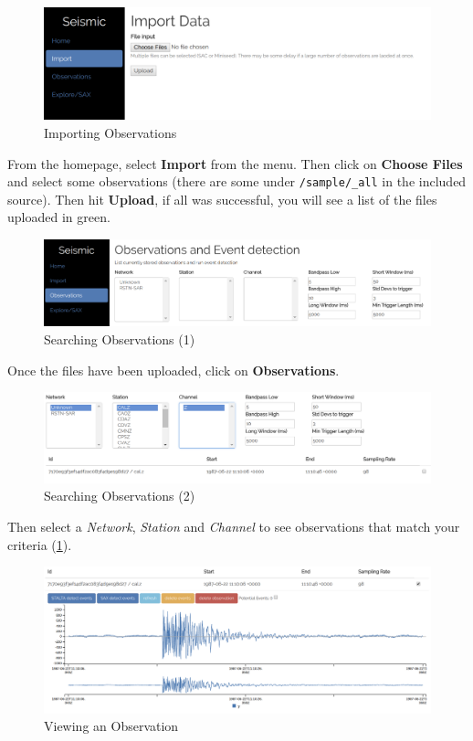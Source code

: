\documentclass[../report.tex]{subfiles}
\begin{document}
\begin{figure}[H]
	\centering
	\includegraphics[width=1\linewidth]{img/run-import}
	\caption{Importing Observations}
\end{figure}

	From the homepage, select \textbf{Import} from the menu.  Then click on \textbf{Choose Files} and select some observations (there are some under \texttt{/sample/\_all} in the included source).  Then hit \textbf{Upload}, if all was successful, you will see a list of the files uploaded in green.

\begin{figure}[H]
	\centering
	\includegraphics[width=1\linewidth]{img/run-observations}
	\caption{Searching Observations (1)}
\end{figure}

	Once the files have been uploaded, click on \textbf{Observations}.

\begin{figure}[H]
	\centering
	\includegraphics[width=1\linewidth]{img/run-select}
	\caption{Searching Observations (2)}
	\label{fig:run-select}
\end{figure}

	Then select a \textit{Network}, \textit{Station} and \textit{Channel} to see observations that match your criteria (\cref{fig:run-select}).

\begin{figure}[H]
	\centering
	\includegraphics[width=1\linewidth]{img/run-render}
	\caption{Viewing an Observation}
	\label{fig:run-render}
\end{figure}
\end{document}
